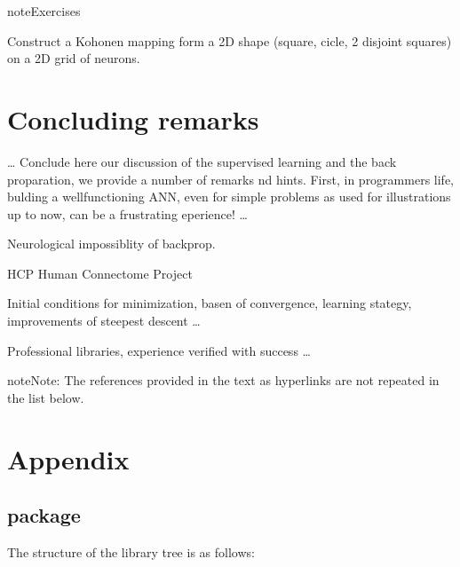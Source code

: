 \documentclass[letterpaper,10pt,english]{jupyterBook}
\begin{document}
\begin{sphinxadmonition}{note}{Exercises}

\sphinxAtStartPar
Construct a Kohonen mapping form a 2D shape (square, cicle, 2 disjoint squares) on a 2D grid of neurons.
\end{sphinxadmonition}


\chapter{Concluding remarks}
\label{\detokenize{docs/conclusion:concluding-remarks}}\label{\detokenize{docs/conclusion::doc}}
\sphinxAtStartPar
… Conclude here our discussion of the supervised learning and the back proparation, we provide a number of remarks nd hints. First, in programmers life, bulding a well\sphinxhyphen{}functioning ANN, even for simple problems as used for illustrations up to now, can be a frustrating eperience! …

\sphinxAtStartPar
Neurological impossiblity of backprop.

\sphinxAtStartPar
HCP \sphinxhyphen{} Human Connectome Project 

\sphinxAtStartPar
Initial conditions for minimization, basen of convergence, learning stategy, improvements of steepest descent …

\sphinxAtStartPar
Professional libraries, experience verified with success …

\begin{sphinxadmonition}{note}{Note:}
\sphinxAtStartPar
The references provided in the text as hyperlinks are not repeated in the list below.
\end{sphinxadmonition}

\sphinxAtStartPar



\chapter{Appendix}
\label{\detokenize{docs/lib_app:appendix}}\label{\detokenize{docs/lib_app:app-lab}}\label{\detokenize{docs/lib_app::doc}}

\section{ package}
\label{\detokenize{docs/lib_app:neural-package}}
\sphinxAtStartPar
The structure of the library tree is as follows:
\end{document}
